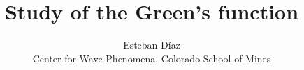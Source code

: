 

\author[E.~D\'{i}az]
{Esteban D\'{i}az \\ 
Center for Wave Phenomena, 
Colorado School of Mines}
\title[Green's funtion analisys]{Study of the Green's function}
\maketitle











